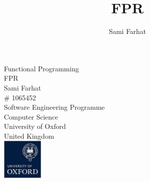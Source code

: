 \documentclass[11pt, fleqn]{article}
\author{Sami Farhat}
\title{FPR}
\begin{document}

\clearpage

\thispagestyle{empty} %
\pagebreak
\begin{titlepage}
  \begin{center}
    \vspace*{1cm}
    {\Huge Functional Programming} \\
    \vspace{0.5cm}
    {\LARGE FPR\\}
    \vspace{0.5cm}
    \vspace{3.5cm}
    {\LARGE Sami Farhat\\}
    \vspace{0.1cm}
    {\Large \# 1065452\\}
    \vspace{0.3cm}
    \vfill
    \vspace{0.8cm}
    Software Engineering Programme\\
    Computer Science\\
    \vspace{0.5cm}
    University of Oxford\\
    United Kingdom\\
    \vspace{1.0cm}
    \includegraphics[width=0.15\textwidth]{oxford-logo.png}
  \end{center}
\end{titlepage}


\clearpage
\tableofcontents
\thispagestyle{empty} %
\pagebreak
{} %

%

\end{document}
